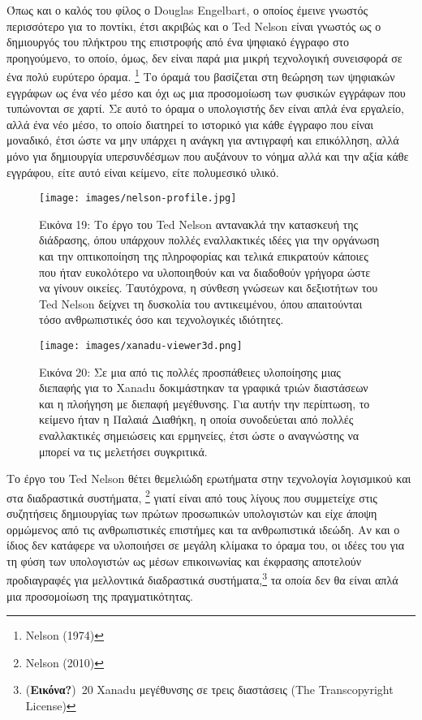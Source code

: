\documentclass[
]{article}
\begin{document}
Όπως και ο καλός του φίλος ο Douglas Engelbart, ο οποίος έμεινε γνωστός
περισσότερο για το ποντίκι, έτσι ακριβώς και ο Ted Nelson είναι γνωστός
ως ο δημιουργός του πλήκτρου της επιστροφής από ένα ψηφιακό έγγραφο στο
προηγούμενο, το οποίο, όμως, δεν είναι παρά μια μικρή τεχνολογική
συνεισφορά σε ένα πολύ ευρύτερο όραμα. \footnote{Nelson (1974)} Το όραμά
του βασίζεται στη θεώρηση των ψηφιακών εγγράφων ως ένα νέο μέσο και όχι
ως μια προσομοίωση των φυσικών εγγράφων που τυπώνονται σε χαρτί. Σε αυτό
το όραμα ο υπολογιστής δεν είναι απλά ένα εργαλείο, αλλά ένα νέο μέσο,
το οποίο διατηρεί το ιστορικό για κάθε έγγραφο που είναι μοναδικό, έτσι
ώστε να μην υπάρχει η ανάγκη για αντιγραφή και επικόλληση, αλλά μόνο για
δημιουργία υπερσυνδέσμων που αυξάνουν το νόημα αλλά και την αξία κάθε
εγγράφου, είτε αυτό είναι κείμενο, είτε πολυμεσικό υλικό.

\leavevmode{}%
\begin{figure}
\hypertarget{fig:nelson-profile}{%
\centering
\texttt{[image: images/nelson-profile.jpg]}
\caption{Εικόνα 19: Το έργο του Ted Nelson αντανακλά την κατασκευή της
διάδρασης, όπου υπάρχουν πολλές εναλλακτικές ιδέες για την οργάνωση και
την οπτικοποίηση της πληροφορίας και τελικά επικρατούν κάποιες που ήταν
ευκολότερο να υλοποιηθούν και να διαδοθούν γρήγορα ώστε να γίνουν
οικείες. Ταυτόχρονα, η σύνθεση γνώσεων και δεξιοτήτων του Ted Nelson
δείχνει τη δυσκολία του αντικειμένου, όπου απαιτούνται τόσο
ανθρωπιστικές όσο και τεχνολογικές ιδιότητες.}\label{fig:nelson-profile}
}
\end{figure}

\leavevmode{}%
\begin{figure}
\hypertarget{fig:xanadu-viewer3d}{%
\centering
\texttt{[image: images/xanadu-viewer3d.png]}
\caption{Εικόνα 20: Σε μια από τις πολλές προσπάθειες υλοποίησης μιας
διεπαφής για το Xanadu δοκιμάστηκαν τα γραφικά τριών διαστάσεων και η
πλοήγηση με διεπαφή μεγέθυνσης. Για αυτήν την περίπτωση, το κείμενο ήταν
η Παλαιά Διαθήκη, η οποία συνοδεύεται από πολλές εναλλακτικές σημειώσεις
και ερμηνείες, έτσι ώστε ο αναγνώστης να μπορεί να τις μελετήσει
συγκριτικά.}\label{fig:xanadu-viewer3d}
}
\end{figure}

Το έργο του Ted Nelson θέτει θεμελιώδη ερωτήματα στην τεχνολογία
λογισμικού και στα διαδραστικά συστήματα, \footnote{Nelson (2010)} γιατί
είναι από τους λίγους που συμμετείχε στις συζητήσεις δημιουργίας των
πρώτων προσωπικών υπολογιστών και είχε άποψη ορμώμενος από τις
ανθρωπιστικές επιστήμες και τα ανθρωπιστικά ιδεώδη. Αν και ο ίδιος δεν
κατάφερε να υλοποιήσει σε μεγάλη κλίμακα το όραμα του, οι ιδέες του για
τη φύση των υπολογιστών ως μέσων επικοινωνίας και έκφρασης αποτελούν
προδιαγραφές για μελλοντικά διαδραστικά συστήματα,\footnote{(\textbf{Εικόνα?})~20
  Xanadu μεγέθυνσης σε τρεις διαστάσεις (The Transcopyright License)} τα
οποία δεν θα είναι απλά μια προσομοίωση της πραγματικότητας.
\end{document}
